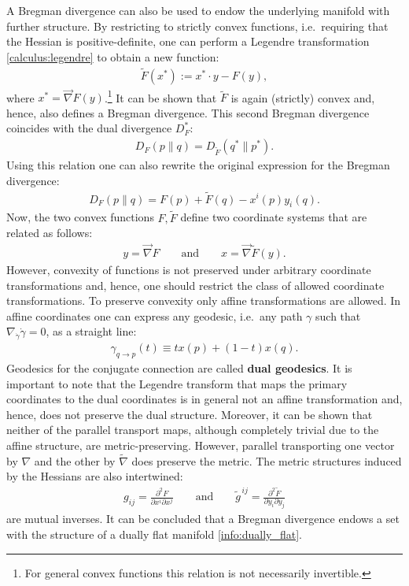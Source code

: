     A Bregman divergence can also be used to endow the underlying manifold with further structure. By restricting to strictly convex functions, i.e.~requiring that the Hessian is positive-definite, one can perform a Legendre transformation \ref{calculus:legendre} to obtain a new function:
    \begin{gather}
        \label{info:legendre}
        \widetilde{F}(x^*) := x^*\cdot y - F(y),
    \end{gather}
    where $x^*=\vec{\nabla}F(y)$.\footnote{For general convex functions this relation is not necessarily invertible.} It can be shown that $\widetilde{F}$ is again (strictly) convex and, hence, also defines a Bregman divergence. This second Bregman divergence coincides with the dual divergence $D_F^*$:
    \begin{gather}
        D_F(p\|q) = D_{\widetilde{F}}(q^*\|p^*).
    \end{gather}
    Using this relation one can also rewrite the original expression for the Bregman divergence:
    \begin{gather}
        D_F(p\|q) = F(p) + \widetilde{F}(q) - x^i(p)y_i(q).
    \end{gather}
    Now, the two convex functions $F,\widetilde{F}$ define two coordinate systems that are related as follows:
    \begin{gather}
        y=\vec{\nabla}F\qquad\text{and}\qquad x=\vec{\nabla}\widetilde{F}(y).
    \end{gather}
    However, convexity of functions is not preserved under arbitrary coordinate transformations and, hence, one should restrict the class of allowed coordinate transformations. To preserve convexity only affine transformations are allowed. In affine coordinates one can express any geodesic, i.e.~any path $\gamma$ such that $\nabla_{\dot{\gamma}}\dot{\gamma}=0$, as a straight line:
    \begin{gather}
        \gamma_{q\rightarrow p}(t) \equiv tx(p) + (1-t)x(q).
    \end{gather}
    Geodesics for the conjugate connection are called \textbf{dual geodesics}. It is important to note that the Legendre transform that maps the primary coordinates to the dual coordinates is in general not an affine transformation and, hence, does not preserve the dual structure. Moreover, it can be shown that neither of the parallel transport maps, although completely trivial due to the affine structure, are metric-preserving. However, parallel transporting one vector by $\nabla$ and the other by $\widetilde{\nabla}$ does preserve the metric. The metric structures induced by the Hessians are also intertwined:
    \begin{gather}
        \label{info:bregman_metric}
        g_{ij} = \frac{\partial^2F}{\partial x^i\partial x^j}\qquad\text{and}\qquad \widetilde{g}^{\,ij} = \frac{\partial^2\widetilde{F}}{\partial y_i\partial y_j}
    \end{gather}
    are mutual inverses. It can be concluded that a Bregman divergence endows a set with the structure of a dually flat manifold \ref{info:dually_flat}.

